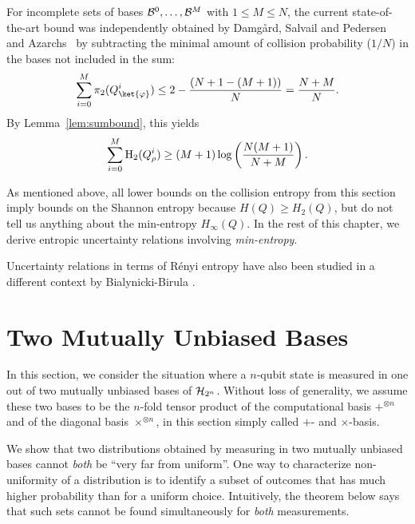 For incomplete sets of bases $\mathcal{B}^{0},\ldots,\mathcal{B}^{M}$ with $1 \leq M
\leq N$, the current state-of-the-art bound was independently obtained
by Damg{\aa}rd, Salvail and Pedersen~\cite{DPS04} and
Azarchs~\cite{Azarchs04} by subtracting the minimal amount of
collision probability ($1/N$) in the bases not included in the sum:
\begin{equation}
\sum_{i=0}^{M} \pi_2(Q^i_{\ket{\varphi}}) \leq 2 - \frac{(N + 1 - (M+1))}{N} 
  = \frac{N + M}{N}. \label{eq:sumcollision}
\end{equation}
By Lemma~\ref{lem:sumbound}, this yields
\begin{equation}
\sum_{i=0}^{M} \operatorname{H}_2(Q^i_\rho) \geq (M+1) \log \left( \frac{N (M+1)}{N+M} \right).    
\end{equation}

As mentioned above, all lower bounds on the collision entropy from
this section imply bounds on the Shannon 
entropy because $H(Q) \geq H_2(Q)$, but do not tell us anything about
the min-entropy $H_\infty(Q)$.  In the rest of this chapter, we derive
entropic uncertainty relations involving \emph{min-entropy}.

Uncertainty relations in terms of R\'enyi entropy have also been studied in a
different context by Bialynicki-Birula \cite{Bialynicki06}.


\section{Two Mutually Unbiased Bases}\label{sec:twounbiasedbases}
In this section, we consider the situation where a $n$-qubit state is
measured in one out of two mutually unbiased bases of
$\mathcal{H}_{2^n}$. Without loss of generality, we assume these two bases to
be the $n$-fold tensor product of the computational basis $+^{\otimes
  n}$ and of the diagonal basis $\times^{\otimes n}$, in this section
simply called $+$- and $\times$-basis. 

We show that two distributions obtained by measuring in two mutually
unbiased bases cannot \emph{both} be ``very far from uniform''. One
way to characterize non-uniformity of a distribution is to identify a
subset of outcomes that has much higher probability than for a uniform
choice. Intuitively, the theorem below says that such sets cannot be
found simultaneously for \emph{both} measurements. 

